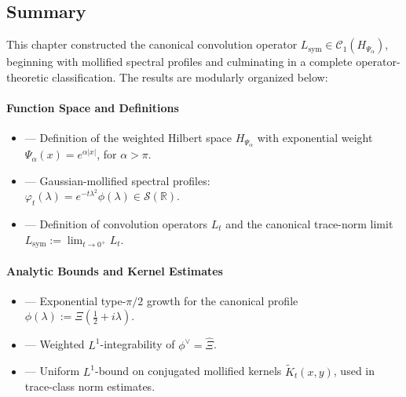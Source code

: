 \subsection*{Summary}

This chapter constructed the canonical convolution operator \( L_{\mathrm{sym}} \in \mathcal{C}_1(H_{\Psi_\alpha}) \), beginning with mollified spectral profiles and culminating in a complete operator-theoretic classification. The results are modularly organized below:

\paragraph{Function Space and Definitions}
\begin{itemize}
  \item {} — Definition of the weighted Hilbert space \( H_{\Psi_\alpha} \) with exponential weight \( \Psi_\alpha(x) = e^{\alpha |x|} \), for \( \alpha > \pi \).
  \item {} — Gaussian-mollified spectral profiles:\\
  \hspace*{1.5em} \( \varphi_t(\lambda) = e^{-t\lambda^2} \phi(\lambda) \in \mathcal{S}(\mathbb{R}) \).
  \item {} — Definition of convolution operators \( L_t \) and the canonical trace-norm limit \( L_{\mathrm{sym}} := \lim_{t \to 0^+} L_t \).
\end{itemize}

\paragraph{Analytic Bounds and Kernel Estimates}
\begin{itemize}
  \item {} — Exponential type-\( \pi/2 \) growth for the canonical profile \( \phi(\lambda) := \Xi(\tfrac{1}{2} + i\lambda) \).
  \item {} — Weighted \( L^1 \)-integrability of \( \phi^\vee = \widehat{\Xi} \).
  \item {} — Uniform \( L^1 \)-bound on conjugated mollified kernels \( \widetilde{K}_t(x,y) \), used in trace-class norm estimates.
\end{itemize}

